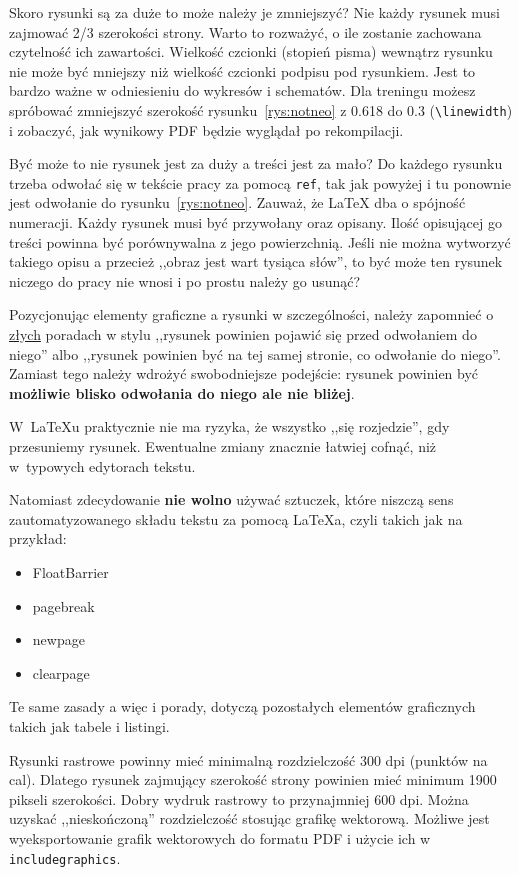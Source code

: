 Skoro rysunki są za duże to może należy je zmniejszyć? Nie każdy rysunek musi zajmować 2/3 szerokości strony. Warto to rozważyć, o ile zostanie zachowana czytelność ich zawartości. Wielkość czcionki (stopień pisma) wewnątrz rysunku nie może być mniejszy niż wielkość czcionki podpisu pod rysunkiem. Jest to bardzo ważne w odniesieniu do wykresów i schematów. Dla treningu możesz spróbować zmniejszyć szerokość rysunku~\ref{rys:notneo} z 0.618 do 0.3 (\texttt{\textbackslash linewidth}) i zobaczyć, jak wynikowy PDF będzie wyglądał po rekompilacji.

Być może to nie rysunek jest za duży a treści jest za mało? Do każdego rysunku trzeba odwołać się w tekście pracy za pomocą \texttt{ref}, tak jak powyżej i tu ponownie jest odwołanie do rysunku~\ref{rys:notneo}. Zauważ, że \LaTeX{} dba o spójność numeracji. Każdy rysunek musi być przywołany oraz opisany. Ilość opisującej go treści powinna być porównywalna z jego powierzchnią. Jeśli nie można wytworzyć takiego opisu a przecież ,,obraz jest wart tysiąca słów'', to być może ten rysunek niczego do pracy nie wnosi i po prostu należy go usunąć?

Pozycjonując elementy graficzne a rysunki w szczególności, należy zapomnieć o \underline{złych} poradach w stylu ,,rysunek powinien pojawić się przed odwołaniem do niego'' albo ,,rysunek powinien być na tej samej stronie, co odwołanie do niego''. Zamiast tego należy wdrożyć swobodniejsze podejście: rysunek powinien być \textbf{możliwie blisko odwołania do niego ale nie bliżej}.

W~\LaTeX{u} praktycznie nie ma ryzyka, że wszystko ,,się rozjedzie'', gdy przesuniemy rysunek. Ewentualne zmiany znacznie łatwiej cofnąć, niż w~typowych edytorach tekstu.

Natomiast zdecydowanie \textbf{nie wolno} używać sztuczek, które niszczą sens zautomatyzowanego składu tekstu za pomocą \LaTeX{a}, czyli takich jak na przykład:
\begin{itemize}
	\item FloatBarrier
	\item pagebreak
	\item newpage
	\item clearpage
\end{itemize}

Te same zasady a więc i porady, dotyczą pozostałych elementów graficznych takich jak tabele i listingi.

Rysunki rastrowe powinny mieć minimalną rozdzielczość 300 dpi (punktów na cal). Dlatego rysunek zajmujący szerokość strony powinien mieć minimum 1900 pikseli szerokości. Dobry wydruk rastrowy to przynajmniej 600 dpi. Można uzyskać ,,nieskończoną'' rozdzielczość stosując grafikę wektorową. Możliwe jest wyeksportowanie grafik wektorowych do formatu PDF i użycie ich w \texttt{includegraphics}.


